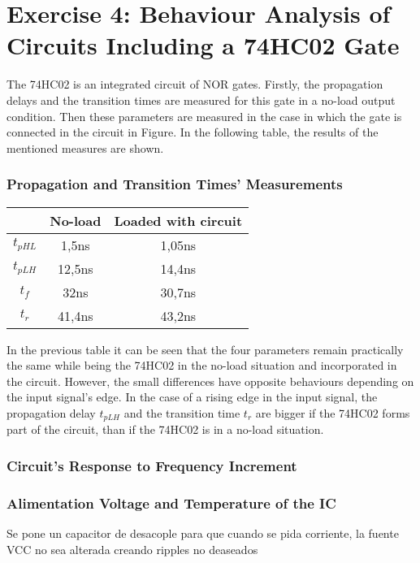 \documentclass[a4paper,11pt]{report}
\begin{document}
\section{\color{olive}Exercise 4: Behaviour Analysis of Circuits Including a 74HC02 Gate}

The 74HC02 is an integrated circuit of NOR gates. Firstly, the propagation delays and the transition times are measured for this gate in a no-load output condition. Then these parameters are measured in the case in which the gate is connected in the circuit in Figure. %
In the following table, the results of the mentioned measures are shown.

\subsubsection{\color{red}Propagation and Transition Times' Measurements}

\begin{tabular}{|c|c|c|}
\hline
 &No-load & Loaded with circuit \\ %
\hline
\hline
$t_{pHL}$ & 1,5ns & 1,05ns \\
\hline
$t_{pLH}$ & 12,5ns & 14,4ns\\
\hline
$t_{f}$ & 32ns & 30,7ns\\
\hline
$t_{r}$ & 41,4ns & 43,2ns \\
\hline
\end{tabular}

In the previous table it can be seen that the four parameters remain practically the same while being the 74HC02 in the no-load situation and incorporated in the circuit. However, the small differences have opposite behaviours depending on the input signal's edge. In the case of a rising edge in the input signal, the propagation delay $t_{pLH}$ and the transition time $t_{r}$ are bigger if the 74HC02 forms part of the circuit, than if the 74HC02 is in a no-load situation.

\subsubsection{\color{red}Circuit's Response to Frequency Increment}



\subsubsection{\color{red}Alimentation Voltage and Temperature of the IC}


Se pone un capacitor de desacople para que cuando se pida corriente, la fuente VCC no sea alterada creando ripples no deaseados 
\end{document}

